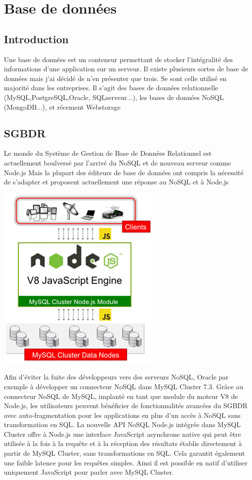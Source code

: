 \chapter{Base de données}

\section{Introduction}
Une base de données est un conteneur permettant de stocker l'intégralité des informations d'une application sur un serveur.
Il existe plusieurs sortes de base de données mais j'ai décidé de n'en présenter que trois. Se sont celle utilisé en majorité dans les entreprises.
Il s'agit des bases de données relationnelle (MySQL,PostgreSQL,Oracle, SQLserveur...), les bases de données NoSQL (MongoDB...), et récement Webstorage


\section{SGBDR}
Le monde du Système de Gestion de Base de Données Relationnel est actuellement boulversé par l'arrivé du NoSQL et de nouveau serveur comme Node.js
Mais la plupart des éditeurs de base de données ont compris la nécessité de s'adapter et proposent actuellement une réponse au NoSQL et à Node.js


\begin{center}
\includegraphics[scale=0.8]{img/mysql-cluster.png} 
\label{Graphique technologie mysql cluster}
\end{center}

Afin d'éviter la fuite des développeurs vers des serveurs NoSQL, Oracle par exemple à développer un connecteur NoSQL dans MySQL Cluster 7.3.
Grâce au connecteur NoSQL de MySQL, implanté en tant que module du moteur V8 de Node.js, les utilisateurs peuvent bénéficier de fonctionnalités avancées du SGBDR avec auto-fragmentation pour les applications en plus d’un accès à NoSQL sans transformation en SQL.
La nouvelle API NoSQL Node.js intégrée dans MySQL Cluster offre à Node.js une interface JavaScript asynchrone native qui peut être utilisée à la fois à la requête et à la réception des résultats établis directement à partir de MySQL Cluster, sans transformations en SQL. Cela garantit également une faible latence pour les requêtes simples. Ainsi il est possible en natif d'utiliser uniquement JavaScript pour parler avec MySQL Cluster.

